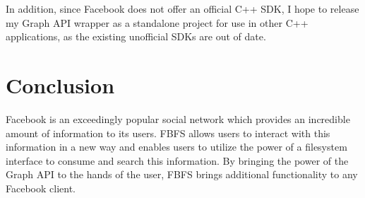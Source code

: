 \documentclass[11pt,twocolumn]{article}
\begin{document}
In addition, since Facebook does not offer an official C++ SDK, I hope to
release my Graph API wrapper as a standalone project for use in other C++
applications, as the existing unofficial SDKs are out of date.

\section{Conclusion}

Facebook is an exceedingly popular social network which provides an incredible
amount of information to its users. FBFS allows users to interact with this
information in a new way and enables users to utilize the power of a filesystem
interface to consume and search this information. By bringing the power of the
Graph API to the hands of the user, FBFS brings additional functionality to any
Facebook client.



\end{document}
